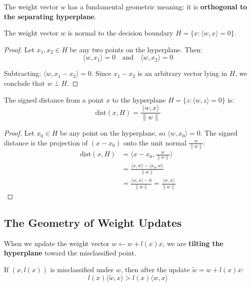 \documentclass[main.tex]{subfiles}
\begin{document}
The weight vector $w$ has a fundamental geometric meaning: it is \textbf{orthogonal to the separating hyperplane}.

\begin{proposition}
The weight vector $w$ is normal to the decision boundary $H = \{x : \langle w, x \rangle = 0\}$.
\end{proposition}

\begin{proof}
Let $x_1, x_2 \in H$ be any two points on the hyperplane. Then:
$$\langle w, x_1 \rangle = 0 \quad \text{and} \quad \langle w, x_2 \rangle = 0$$

Subtracting: $\langle w, x_1 - x_2 \rangle = 0$. Since $x_1 - x_2$ is an arbitrary vector lying in $H$, we conclude that $w \perp H$.
\end{proof}

\begin{proposition}
The signed distance from a point $x$ to the hyperplane $H = \{z : \langle w, z \rangle = 0\}$ is:
$$\text{dist}(x, H) = \frac{\langle w, x \rangle}{\|w\|}$$
\end{proposition}

\begin{proof}
Let $x_0 \in H$ be any point on the hyperplane, so $\langle w, x_0 \rangle = 0$. The signed distance is the projection of $(x - x_0)$ onto the unit normal $\frac{w}{\|w\|}$:
\begin{align}
\text{dist}(x, H) &= \langle x - x_0, \frac{w}{\|w\|} \rangle \\[6pt]
&= \frac{\langle x, w \rangle - \langle x_0, w \rangle}{\|w\|} \\[6pt]
&= \frac{\langle w, x \rangle - 0}{\|w\|} = \frac{\langle w, x \rangle}{\|w\|}
\end{align}
\end{proof}

\subsection{The Geometry of Weight Updates}

When we update the weight vector $w \leftarrow w + l(x)x$, we are \textbf{tilting the hyperplane} toward the misclassified point.

\begin{proposition}
If $(x, l(x))$ is misclassified under $w$, then after the update $\tilde{w} = w + l(x)x$:
$$l(x) \langle \tilde{w}, x \rangle > l(x) \langle w, x \rangle$$
\end{proposition}
\end{document}
